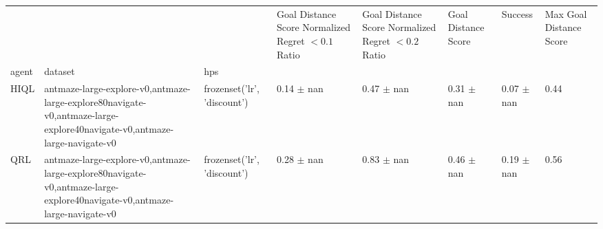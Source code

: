 \begin{tabular}{llllllll}
\toprule
 &  &  & Goal Distance Score Normalized Regret $< 0.1$ Ratio & Goal Distance Score Normalized Regret $< 0.2$ Ratio & Goal Distance Score & Success & Max Goal Distance Score \\
agent & dataset & hps &  &  &  &  &  \\
\midrule
HIQL & antmaze-large-explore-v0,antmaze-large-explore80navigate-v0,antmaze-large-explore40navigate-v0,antmaze-large-navigate-v0 & frozenset({'lr', 'discount'}) & 0.14 $\pm$ nan & 0.47 $\pm$ nan & 0.31 $\pm$ nan & 0.07 $\pm$ nan & 0.44 \\
\cline{1-8} \cline{2-8}
QRL & antmaze-large-explore-v0,antmaze-large-explore80navigate-v0,antmaze-large-explore40navigate-v0,antmaze-large-navigate-v0 & frozenset({'lr', 'discount'}) & 0.28 $\pm$ nan & 0.83 $\pm$ nan & 0.46 $\pm$ nan & 0.19 $\pm$ nan & 0.56 \\
\cline{1-8} \cline{2-8}
\bottomrule
\end{tabular}
